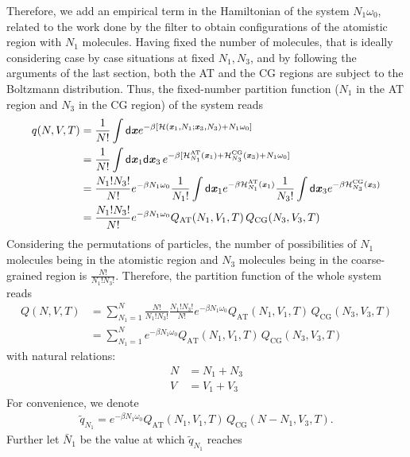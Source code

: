 \documentclass[aip,jcp,a4paper,reprint,onecolumn]{revtex4-1}
\newcommand{\vect}[1]{\textbf{\textit{#1}}}
\newcommand{\dd}[1]{\textsf{#1}}
\newcommand{\AT}{{\textrm{{AT}}}}
\newcommand{\CG}{{\textrm{CG}}}
\begin{document}
Therefore, we add an empirical term in the Hamiltonian of the system
$N_1\omega_0$, related to the work done  by the filter to obtain configurations of the atomistic region with $N_{1}$ molecules. 
Having fixed the number of molecules, that is ideally considering case by case situations at fixed $N_{1},N_{3}$, and by following the
arguments of the last section, both the AT and the CG regions are
subject to the Boltzmann distribution.
Thus, the fixed-number partition function ($N_1$ in the AT region and $N_3$ in the CG region) of the system reads
\begin{align}\nonumber
  q(N,V,T)
  &= \frac1{N!}\int
  \dd d\vect x
  e^{-\beta
    [\mathcal H(\vect x_1, N_1; \vect x_3, N_3) +
    N_1\omega_0]}\\\nonumber
  &= \frac1{N!}\int
  \dd d\vect x_1\dd d\vect x_3\,
  e^{-\beta
    [\mathcal H_{N_1}^{\AT}(\vect x_1) +
    \mathcal H_{N_3}^{\CG}(\vect x_3) +
    N_1\omega_0]}\\\nonumber
  & = \frac{N_1!N_3!}{N!}
  e^{-\beta N_1\omega_0}
  \frac{1}{N_1!}\int\dd d\vect x_1 e^{-\beta\mathcal H_{N_1}^{\AT}(\vect x_1)}
  \frac{1}{N_3!}\int\dd d\vect x_3 e^{-\beta\mathcal H_{N_3}^{\CG}(\vect x_3)}\\
  & = \frac{N_1!N_3!}{N!}
  e^{-\beta N_1\omega_0}
  Q_{\AT}(N_1, V_1, T)\,
  Q_{\CG}(N_3, V_3, T) 
\end{align}
Considering the permutations of particles, the number of possibilities of
$N_1$ molecules being in the atomistic region and $N_3$ molecules being
in the coarse-grained region is  $\frac{N!}{N_1!N_3!}$.
Therefore, the partition function of the whole system reads
\begin{align}\nonumber
  Q(N,V,T) &= \sum_{N_1=1}^N
  \frac{N!}{N_1!N_3!} \frac{N_1!N_3!}{N!}
  e^{-\beta N_1\omega_0}
  Q_{\AT}(N_1, V_1, T)\,
  Q_{\CG}(N_3, V_3, T) \\
  &= \sum_{N_1=1}^N
  e^{-\beta N_1\omega_0}
  Q_{\AT}(N_1, V_1, T)\,
  Q_{\CG}(N_3, V_3, T) 
\end{align}
with natural relations:
\begin{align}
  N &= N_1 + N_3\\
  V &= V_1 + V_3
\end{align}
For convenience, we denote
\begin{align}
  \tilde q_{N_1} = 
  e^{-\beta N_1\omega_0}
  Q_{\AT}(N_1, V_1, T)\,
  Q_{\CG}(N - N_1, V_3, T).
\end{align}
Further let $\bar N_1$ be the value at which $\tilde q_{N_1}$ reaches
\end{document}
